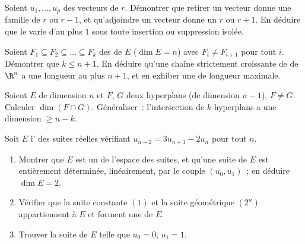 \begin{exercise}[$\star\star$]\label{exo:b1:findim:7}
Soient $u_1, \dots, u_p$ des vecteurs de  $r$. Démontrer que
retirer un vecteur donne une famille de  $r$ ou $r - 1$, et
qu'adjoindre un vecteur donne un  $r$ ou $r + 1$. En déduire que
le  varie d'au plus $1$ sous toute insertion ou suppression
isolée.
\end{exercise}

\begin{exercise}[$\star\star\star$]\label{exo:b1:findim:8}
Soient $F_1 \subseteq F_2 \subseteq \dots \subseteq F_k$ des
 de $E$ ($\dim E = n$) avec $F_i \neq F_{i+1}$ pour tout
$i$. Démontrer que $k \leq n + 1$. En déduire qu'une chaîne
strictement croissante de  de $\R^n$ a une longueur au
plus $n + 1$, et en exhiber une de longueur maximale.
\end{exercise}

\begin{exercise}[$\star\star\star$]\label{exo:b1:findim:9}
Soient $E$ de dimension $n$ et $F$, $G$ deux hyperplans (de dimension
$n - 1$), $F \neq G$. Calculer $\dim(F \cap G)$. Généraliser~:
l'intersection de $k$ hyperplans a une dimension $\geq n - k$.
\end{exercise}

\begin{exercise}[$\star\star$]\label{exo:b1:findim:10}
Soit $E$ l' des suites réelles vérifiant $u_{n+2} =
3u_{n+1} - 2u_n$ pour tout $n$.
\begin{enumerate}
  \item Montrer que $E$ est un  de l'espace des suites, et
        qu'une suite de $E$ est entièrement déterminée, linéairement,
        par le couple $(u_0, u_1)$~; en déduire $\dim E = 2$.
  \item Vérifier que la suite constante $(1)$ et la suite géométrique
        $(2^n)$ appartiennent à $E$ et forment une  de $E$.
  \item Trouver la suite de $E$ telle que $u_0 = 0$, $u_1 = 1$.
\end{enumerate}
\end{exercise}


